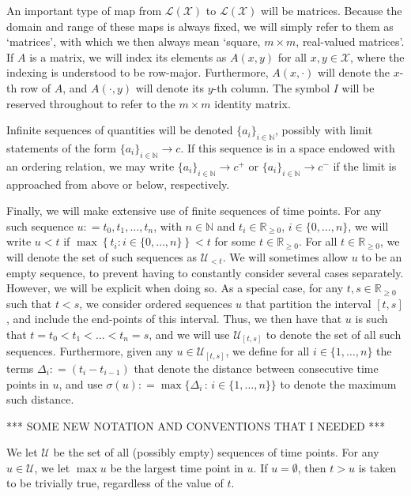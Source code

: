 \documentclass[10pt]{paper}
\theoremstyle{definition}
\newcommand{\nats}{\mathbb{N}}
\newcommand{\reals}{\mathbb{R}}
\newcommand{\realsnonneg}{\reals_{\geq 0}}
\newcommand{\states}{\mathcal{X}}
\newcommand{\gambles}{\mathcal{L}}
\newcommand{\gamblesX}{\gambles(\states)}
\newcommand{\coloneqq}{:\!=}
\begin{document}
An important type of map from $\gamblesX$ to $\gamblesX$ will be matrices. Because the domain and range of these maps is always fixed, we will simply refer to them as `matrices', with which we then always mean `square, $m\times m$, real-valued matrices'. If $A$ is a matrix, we will index its elements as $A(x,y)$ for all $x,y\in\states$, where the indexing is understood to be row-major. Furthermore, $A(x,\cdot)$ will denote the $x$-th row of $A$, and $A(\cdot,y)$ will denote its $y$-th column. The symbol $I$ will be reserved throughout to refer to the $m\times m$ identity matrix.

Infinite sequences of quantities will be denoted $\{a_i\}_{i\in\nats}$, possibly with limit statements of the form $\{a_i\}_{i\in\nats}\to c$. If this sequence is in a space endowed with an ordering relation, we may write $\{a_i\}_{i\in\nats}\to c^+$ or $\{a_i\}_{i\in\nats}\to c^-$ if the limit is approached from above or below, respectively.

Finally, we will make extensive use of finite sequences of time points. For any such sequence $u\coloneqq t_0,t_1,\ldots,t_n$, with $n\in\nats$ and $t_i\in\realsnonneg$, $i\in\{0,\ldots,n\}$, we will write $u<t$ if $\max\left\{t_i:i\in\{0,\ldots,n\}\right\}<t$ for some $t\in\realsnonneg$. For all $t\in\realsnonneg$, we will denote the set of such sequences as $\mathcal{U}_{<t}$. We will sometimes allow $u$ to be an empty sequence, to prevent having to constantly consider several cases separately. However, we will be explicit when doing so. As a special case, for any $t,s\in\realsnonneg$ such that $t<s$, we consider ordered sequences $u$ that partition the interval $[t,s]$, and include the end-points of this interval. Thus, we then have that $u$ is such that $t=t_0 < t_1 <\ldots < t_n = s$, and we will use $\mathcal{U}_{[t,s]}$ to denote the set of all such sequences. Furthermore, given any $u\in\mathcal{U}_{[t,s]}$, we define for all $i\in\{1,\ldots,n\}$ the terms $\Delta_i\coloneqq (t_i-t_{i-1})$ that denote the distance between consecutive time points in $u$, and use $\sigma(u) \coloneqq \max\bigl\{\Delta_i\,:\,i\in\{1,\ldots,n\}\bigr\}$ to denote the maximum such distance.

*** SOME NEW NOTATION AND CONVENTIONS THAT I NEEDED ***

We let $\mathcal{U}$ be the set of all (possibly empty) sequences of time points. For any $u\in\mathcal{U}$, we let $\max u$ be the largest time point in $u$. If $u=\emptyset$, then $t>u$ is taken to be trivially true, regardless of the value of $t$.
\end{document}
